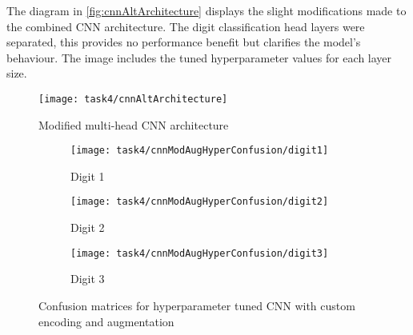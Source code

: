 The diagram in \autoref{fig:cnnAltArchitecture} displays the slight modifications made to the combined CNN architecture. The digit classification head layers were separated, this provides no performance benefit but clarifies the model's behaviour. The image includes the tuned hyperparameter values for each layer size.

\begin{figure}[!htbp]
    \centering
    \texttt{[image: task4/cnnAltArchitecture]}
    \caption[Modified multi-head CNN architecture]
    {Modified multi-head CNN architecture}
    \label{fig:cnnAltArchitecture}
\end{figure}

\begin{figure}[!htbp]
    \centering
    \begin{subfigure}{0.3\textwidth}
        \texttt{[image: task4/cnnModAugHyperConfusion/digit1]}
        \caption{Digit 1}
        \label{fig:cnnModAugHyperConfusionMatrix1}
    \end{subfigure}
    \begin{subfigure}{0.3\textwidth}
        \texttt{[image: task4/cnnModAugHyperConfusion/digit2]}
        \caption{Digit 2}
        \label{fig:cnnModAugHyperConfusionMatrix2}
    \end{subfigure}
    \begin{subfigure}{0.3\textwidth}
        \texttt{[image: task4/cnnModAugHyperConfusion/digit3]}
        \caption{Digit 3}
        \label{fig:cnnModAugHyperConfusionMatrix3}
    \end{subfigure}
    \caption{Confusion matrices for hyperparameter tuned CNN with custom encoding and augmentation}
    \label{fig:cnnModAugHyperConfusionMatrix}
\end{figure}